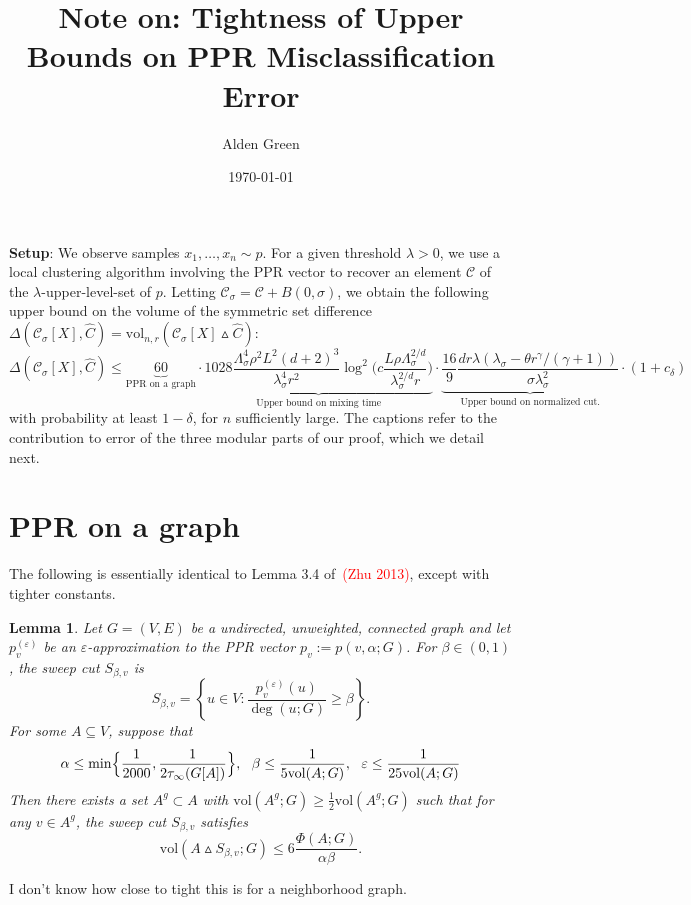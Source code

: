 \documentclass{article}
\newcommand{\set}[1]{\left\{#1\right\}}
\newcommand{\vol}{\mathrm{vol}}
\newcommand{\1}{\mathbf{1}}
\newcommand{\mc}[1]{\mathcal{#1}}
\newcommand{\wh}[1]{\widehat{#1}}
\newtheorem{lemma}{Lemma}
\theoremstyle{definition}
\theoremstyle{remark}
\begin{document}
\title{Note on: Tightness of Upper Bounds on PPR Misclassification Error}
\author{Alden Green}
\date{\today}
\maketitle

\textbf{Setup}: We observe samples $x_1,\ldots,x_n \sim p$. For a given threshold $\lambda > 0$, we use a local clustering algorithm involving the PPR vector to recover an element $\mc{C}$ of the $\lambda$-upper-level-set of $p$. Letting $\mc{C}_{\sigma} = \mc{C} + B(0,\sigma)$, we obtain the following upper bound on the volume of the symmetric set difference $\Delta(\mc{C}_{\sigma}[X], \wh{C})  = \vol_{n,r}(\mc{C}_{\sigma}[X] \vartriangle \wh{C})$:
\begin{equation*}
\Delta(\mc{C}_{\sigma}[X], \wh{C}) \leq \underbrace{60}_{\textrm{PPR on a graph}} \cdot \underbrace{1028 \frac{\Lambda_{\sigma}^4 \rho^2 L^2 (d + 2)^3}{\lambda_{\sigma}^4 r^2} \log^2\biggl(c \frac{L\rho\Lambda_{\sigma}^{2/d}}{\lambda_{\sigma}^{2/d}r}\biggr)}_{\textrm{Upper bound on mixing time}} \cdot \underbrace{\frac{16}{9} \frac{dr\lambda(\lambda_{\sigma} - \theta r^{\gamma}/(\gamma + 1))}{\sigma \lambda_{\sigma}^2}}_{\textrm{Upper bound on normalized cut.}} \cdot (1 + c_\delta)
\end{equation*} 
with probability at least $1 - \delta$, for $n$ sufficiently large. The captions refer to the contribution to error of the three modular parts of our proof, which we detail next.

\section{PPR on a graph}
The following is essentially identical to Lemma 3.4 of~\textcolor{red}{(Zhu 2013)}, except with tighter constants.
\begin{lemma}
	\label{lem:zhu}
	Let $G = (V,E)$ be a undirected, unweighted, connected graph and let $p_v^{(\varepsilon)}$ be an $\varepsilon$-approximation to the PPR vector $p_v := p(v,\alpha;G)$. For $\beta \in (0,1)$,  the sweep cut $S_{\beta,v}$ is
	\begin{equation*}
	S_{\beta,v} = \set{u \in V: \frac{p_v^{(\varepsilon)}(u)}{\deg(u;G)} \geq \beta}.
	\end{equation*} 
	For some $A \subseteq V$, suppose that 
	\begin{equation*}
	\alpha \leq \min\Bigl\{\frac{1}{2000}, \frac{1}{2\tau_{\infty}(G[A])}\Bigr\},~~ \beta \leq \frac{1}{5\vol(A;G)},~~ \varepsilon \leq \frac{1}{25\vol(A;G)}
	\end{equation*}
	Then there exists a set $A^g \subset A$ with $\vol(A^g;G) \geq \frac{1}{2}\vol(A^g;G)$ such that for any $v \in A^g$, the sweep cut $S_{\beta,v}$ satisfies
	\begin{equation*}
	\vol(A \vartriangle S_{\beta,v};G) \leq 6\frac{\Phi(A;G)}{\alpha \beta}.
	\end{equation*}
\end{lemma}
I don't know how close to tight this is for a neighborhood graph.
\end{document}
